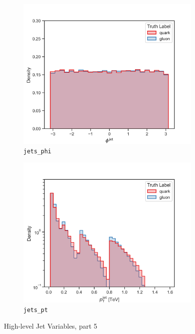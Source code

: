 \begin{figure}[!htb]
\begin{subfigure}[t]{0.48\textwidth}
	\end{subfigure}
	\begin{subfigure}[t]{0.48\textwidth}
		\includegraphics[width=1\textwidth]{src/plots/distributions/highlevel/jets_phi.png}
		\caption{\texttt{jets\_phi}}
		\label{fig:highlevel_28}
	\end{subfigure}
	\begin{subfigure}[t]{0.48\textwidth}
		\includegraphics[width=1\textwidth]{src/plots/distributions/highlevel/jets_pt.png}
		\caption{\texttt{jets\_pt}}
		\label{fig:highlevel_29}
	\end{subfigure}
\caption{High-level Jet Variables, part 5}
\label{fig:highlevel_24-29}
\end{figure}



